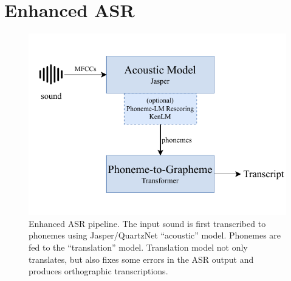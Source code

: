 \chapter{Enhanced ASR}
\label{chap:enhanced_asr}

\begin{figure}[t]
	\centering
	\includegraphics[width=.9\textwidth]{img/easr2}
	\caption{Enhanced ASR pipeline. The input sound is first transcribed to phonemes using Jasper/QuartzNet ``acoustic'' model. Phonemes are fed to the ``translation'' model. Translation model not only translates, but also fixes some errors in the ASR output and produces orthographic transcriptions.}
	\label{fig:asr_enhanced_pipeline}
\end{figure} 


